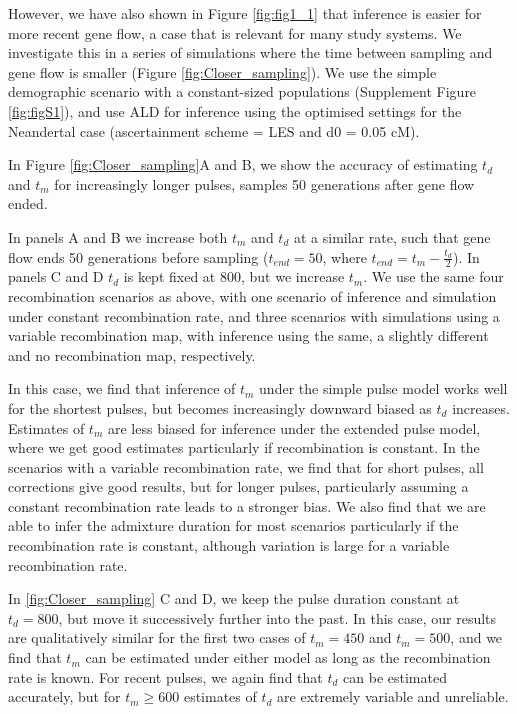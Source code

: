 \documentclass[11pt]{article}
\begin{document}
However, we have also shown in Figure  \ref{fig:fig1_1} that inference is easier for more recent gene flow, a case that is relevant for many study systems. We investigate this in a series of simulations where the time between sampling and gene flow is smaller (Figure \ref{fig:Closer_sampling}). We use the simple demographic scenario with a constant-sized populations (Supplement Figure \ref{fig:figS1}), and use ALD for inference using the optimised settings for the Neandertal case (ascertainment scheme = LES and  d0 = 0.05 cM).

In Figure \ref{fig:Closer_sampling}A and B, we show the accuracy of estimating $t_d$ and $t_m$ for increasingly longer pulses, samples 50 generations after gene flow ended. 

In panels A and B we increase both $t_m$ and $t_d$ at a similar rate, such that gene flow ends 50 generations before sampling ($t_{end}=50$, where $t_{end}= t_m - \frac{t_d}{2}$). In panels C and D $t_d$ is kept fixed at 800, but we increase $t_m$. We use the same four recombination scenarios as above, with one scenario of inference and simulation under constant recombination rate, and three scenarios with simulations using a variable recombination map, with inference using the same, a slightly different and no recombination map, respectively.

In this case, we find that inference of $t_m$ under the simple pulse model works well for the shortest pulses, but becomes increasingly downward biased as $t_d$ increases.  Estimates of $t_m$ are less biased for inference under the extended 
pulse model, where we get good estimates particularly if recombination is constant. In the scenarios with a variable recombination rate, we find that for short pulses, all corrections give good results, but for longer pulses, particularly assuming a constant recombination rate leads to a stronger bias. We also find that we are able to infer the admixture duration for most scenarios particularly if the recombination rate is constant, although variation is large for a variable recombination rate.

In \ref{fig:Closer_sampling} C and D, we keep the pulse duration constant at $t_d=800$, but move it successively further into the past. In this case, our results are qualitatively similar for the first two cases of $t_m=450$ and $t_m=500$, and we find that $t_m$ can be estimated under either model as long as the recombination rate is known. For recent pulses, we again find that  $t_d$ can be estimated accurately, but for $t_m \geq 600$ estimates of $t_d$ are extremely variable and unreliable.
\end{document}
